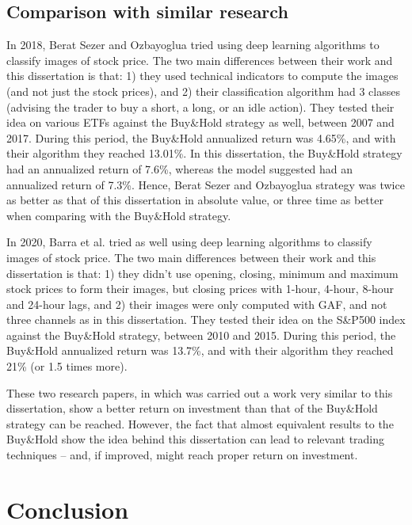 \documentclass[11pt]{article}
\begin{document}
\begin{onehalfspace}
\subsection{Comparison with similar research}
\label{sec:compare}

In 2018, Berat Sezer and Ozbayoglua \cite{berat} tried using deep learning algorithms to classify images of stock price. The two main differences between their work and this dissertation is that: 1) they used technical indicators to compute the images (and not just the stock prices), and 2) their classification algorithm had 3 classes (advising the trader to buy a short, a long, or an idle action). They tested their idea on various ETFs against the Buy\&Hold strategy as well, between 2007 and 2017. During this period, the Buy\&Hold annualized return was 4.65\%, and with their algorithm they reached 13.01\%. In this dissertation, the Buy\&Hold strategy had an annualized return of 7.6\%, whereas the model suggested had an annualized return of 7.3\%. Hence, Berat Sezer and Ozbayoglua strategy was twice as better as that of this dissertation in absolute value, or three time as better when comparing with the Buy\&Hold strategy.

In 2020, Barra et al. \cite{barra} tried as well using deep learning algorithms to classify images of stock price. The two main differences between their work and this dissertation is that: 1) they didn't use opening, closing, minimum and maximum stock prices to form their images, but closing prices with 1-hour, 4-hour, 8-hour and 24-hour lags, and 2) their images were only computed with GAF, and not three channels as in this dissertation. They tested their idea on the S\&P500 index against the Buy\&Hold strategy, between 2010 and 2015. During this period, the Buy\&Hold annualized return was 13.7\%, and with their algorithm they reached 21\% (or 1.5 times more). 

These two research papers, in which was carried out a work very similar to this dissertation, show a better return on investment than that of the Buy\&Hold strategy can be reached. However, the fact that almost equivalent results to the Buy\&Hold show the idea behind this dissertation can lead to relevant trading techniques -- and, if improved, might reach proper return on investment.


\pagebreak

\section{Conclusion}
\label{concl}


\end{onehalfspace}
\end{document}
